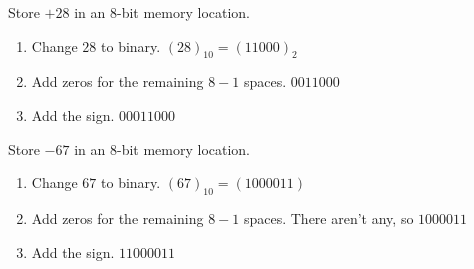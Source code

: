 \documentclass[\main/notes.tex]{subfiles}
\begin{document}
					\begin{example}
						Store $+28$ in an $8$-bit memory location.
						\begin{enumerate}
							\item Change $28$ to binary. $(28)_{10} = (11000)_{2}$
							\item Add zeros for the remaining $8 - 1$ spaces. $0011000$
							\item Add the sign. $00011000$
						\end{enumerate}
					\end{example}
					\begin{example}
						Store $-67$ in an $8$-bit memory location.
						\begin{enumerate}
							\item Change $67$ to binary. $(67)_{10} = (1000011)$
							\item Add zeros for the remaining $8 - 1$ spaces. There aren't any, so $1000011$
							\item Add the sign. $11000011$
						\end{enumerate}
					\end{example}
\end{document}
